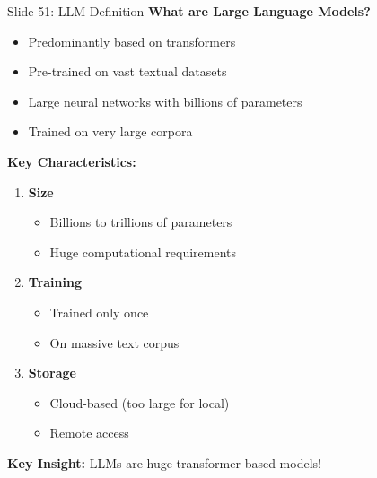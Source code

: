 \documentclass[8pt]{beamer}
\begin{document}
	\begin{frame}{Slide 51: LLM Definition}
		\fontsize{6.5}{7.5}\selectfont
		\textbf{What are Large Language Models?}
		\begin{itemize}
			\item Predominantly based on transformers
			\item Pre-trained on vast textual datasets
			\item Large neural networks with billions of parameters
			\item Trained on very large corpora
		\end{itemize}
		
		\vspace{0.1cm}
		\textbf{Key Characteristics:}
		\begin{enumerate}
			\item \textbf{Size}
			\begin{itemize}
				\item Billions to trillions of parameters
				\item Huge computational requirements
			\end{itemize}
			\item \textbf{Training}
			\begin{itemize}
				\item Trained only once
				\item On massive text corpus
			\end{itemize}
			\item \textbf{Storage}
			\begin{itemize}
				\item Cloud-based (too large for local)
				\item Remote access
			\end{itemize}
		\end{enumerate}
		
		\textcolor{myblue}{\textbf{Key Insight:}} LLMs are huge transformer-based models!
	\end{frame}
	
\end{document}
